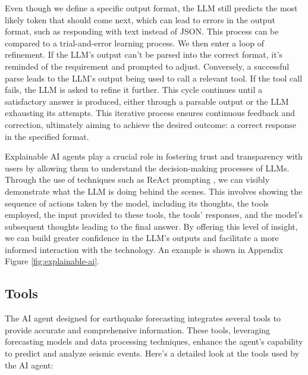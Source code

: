 Even though we define a specific output format, the LLM still predicts
the most likely token that should come next, which can lead to errors
in the output format, such as responding with text instead of JSON.
This process can be compared to a trial-and-error learning process.
We then enter a loop of refinement. If the LLM's output can't be
parsed into the correct format, it's reminded of the requirement
and prompted to adjust. Conversely, a successful parse leads to the
LLM's output being used to call a relevant tool. If the tool call
fails, the LLM is asked to refine it further. This cycle continues
until a satisfactory answer is produced, either through a parsable
output or the LLM exhausting its attempts. This iterative process
ensures continuous feedback and correction, ultimately aiming to
achieve the desired outcome: a correct response in the specified format.

Explainable AI agents play a crucial role in fostering trust and
transparency with users by allowing them to understand the
decision-making processes of \ac{LLM}s. Through the use of
techniques such as ReAct prompting \parencite{yao2023reactsynergizingreasoningacting},
we can visibly demonstrate what the LLM is doing behind the scenes. This
involves showing the sequence of actions taken by the model, including
its thoughts, the tools employed, the input provided to these tools,
the tools' responses, and the model's subsequent thoughts leading to
the final answer. By offering this level of insight, we can build
greater confidence in the LLM's outputs and facilitate a more
informed interaction with the technology. An example is shown in Appendix Figure
\ref{fig:explainable-ai}.

\subsection{Tools}

The AI agent designed for earthquake forecasting integrates several tools
to provide accurate and comprehensive information. These tools, leveraging
forecasting models and data processing techniques, enhance the agent's
capability to predict and analyze seismic events. Here’s a detailed
look at the tools used by the AI agent:

